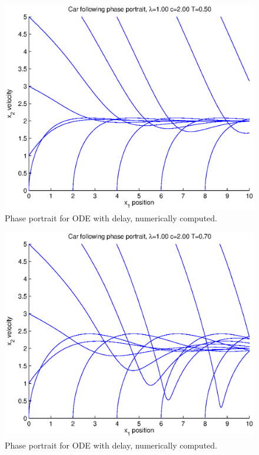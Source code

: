 \documentclass[11pt,a4paper]{article}
\begin{document}
\begin{figure}[ht]
\centering
\includegraphics[width=400pt]{phasedelay1-2-05}
\caption{Phase portrait for ODE with delay, numerically computed.}
\label{phasedelay1-2-05}
\end{figure}

\begin{figure}[ht]
\centering
\includegraphics[width=400pt]{phasedelay1-2-07}
\caption{Phase portrait for ODE with delay, numerically computed.}
\label{phasedelay1-2-07}
\end{figure}
\end{document}
